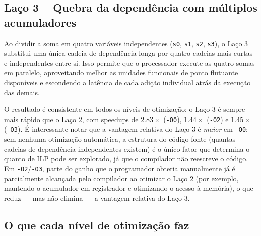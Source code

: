 \documentclass[a4paper,12pt]{article}
\begin{document}
\subsection{Laço 3 -- Quebra da dependência com múltiplos acumuladores}

Ao dividir a soma em quatro variáveis independentes (\texttt{s0}, \texttt{s1}, \texttt{s2}, \texttt{s3}), o Laço 3 substitui uma única cadeia de dependência longa por quatro cadeias mais curtas e independentes entre si. Isso permite que o processador execute as quatro somas em paralelo, aproveitando melhor as unidades funcionais de ponto flutuante disponíveis e escondendo a latência de cada adição individual atrás da execução das demais.

O resultado é consistente em todos os níveis de otimização: o Laço 3 é sempre mais rápido que o Laço 2, com speedups de $2.83\times$ (\texttt{-O0}), $1.44\times$ (\texttt{-O2}) e $1.45\times$ (\texttt{-O3}). É interessante notar que a vantagem relativa do Laço 3 é \emph{maior} em \texttt{-O0}: sem nenhuma otimização automática, a estrutura do código-fonte (quantas cadeias de dependência independentes existem) é o único fator que determina o quanto de ILP pode ser explorado, já que o compilador não reescreve o código. Em \texttt{-O2}/\texttt{-O3}, parte do ganho que o programador obteria manualmente já é parcialmente alcançada pelo compilador ao otimizar o Laço 2 (por exemplo, mantendo o acumulador em registrador e otimizando o acesso à memória), o que reduz — mas não elimina — a vantagem relativa do Laço 3.

\subsection{O que cada nível de otimização faz}
\end{document}
